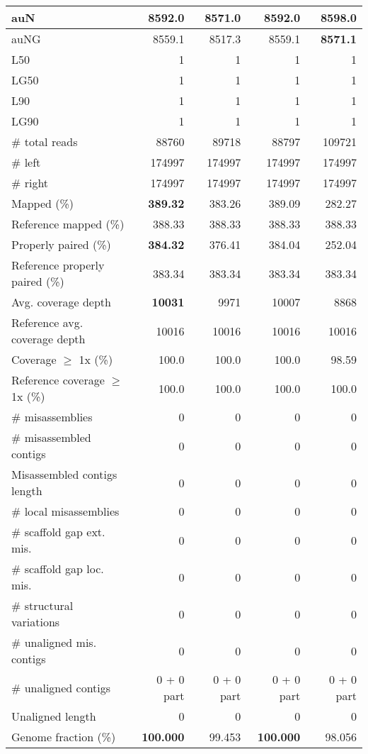 \documentclass[12pt,a4paper]{article}
\begin{document}
\begin{table}[ht]
\begin{center}
\begin{tabular}{|l*{4}{|r}|}
auN & 8592.0 & 8571.0 & 8592.0 & {\bf 8598.0} \\ \hline
auNG & 8559.1 & 8517.3 & 8559.1 & {\bf 8571.1} \\ \hline
L50 & 1 & 1 & 1 & 1 \\ \hline
LG50 & 1 & 1 & 1 & 1 \\ \hline
L90 & 1 & 1 & 1 & 1 \\ \hline
LG90 & 1 & 1 & 1 & 1 \\ \hline
\# total reads & 88760 & 89718 & 88797 & 109721 \\ \hline
\# left & 174997 & 174997 & 174997 & 174997 \\ \hline
\# right & 174997 & 174997 & 174997 & 174997 \\ \hline
Mapped (\%) & {\bf 389.32} & 383.26 & 389.09 & 282.27 \\ \hline
Reference mapped (\%) & 388.33 & 388.33 & 388.33 & 388.33 \\ \hline
Properly paired (\%) & {\bf 384.32} & 376.41 & 384.04 & 252.04 \\ \hline
Reference properly paired (\%) & 383.34 & 383.34 & 383.34 & 383.34 \\ \hline
Avg. coverage depth & {\bf 10031} & 9971 & 10007 & 8868 \\ \hline
Reference avg. coverage depth & 10016 & 10016 & 10016 & 10016 \\ \hline
Coverage $\geq$ 1x (\%) & 100.0 & 100.0 & 100.0 & 98.59 \\ \hline
Reference coverage $\geq$ 1x (\%) & 100.0 & 100.0 & 100.0 & 100.0 \\ \hline
\# misassemblies & 0 & 0 & 0 & 0 \\ \hline
\# misassembled contigs & 0 & 0 & 0 & 0 \\ \hline
Misassembled contigs length & 0 & 0 & 0 & 0 \\ \hline
\# local misassemblies & 0 & 0 & 0 & 0 \\ \hline
\# scaffold gap ext. mis. & 0 & 0 & 0 & 0 \\ \hline
\# scaffold gap loc. mis. & 0 & 0 & 0 & 0 \\ \hline
\# structural variations & 0 & 0 & 0 & 0 \\ \hline
\# unaligned mis. contigs & 0 & 0 & 0 & 0 \\ \hline
\# unaligned contigs & 0 + 0 part & 0 + 0 part & 0 + 0 part & 0 + 0 part \\ \hline
Unaligned length & 0 & 0 & 0 & 0 \\ \hline
Genome fraction (\%) & {\bf 100.000} & 99.453 & {\bf 100.000} & 98.056 \\ \hline

\end{tabular}
\end{center}
\end{table}
\end{document}

